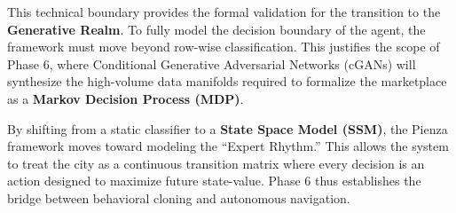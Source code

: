 This technical boundary provides the formal validation for the transition to the \textbf{Generative Realm}. To fully model the decision boundary of the agent, the framework must move beyond row-wise classification. This justifies the scope of Phase 6, where Conditional Generative Adversarial Networks (cGANs) will synthesize the high-volume data manifolds required to formalize the marketplace as a \textbf{Markov Decision Process (MDP)}. 

By shifting from a static classifier to a \textbf{State Space Model (SSM)}, the Pienza framework moves toward modeling the ``Expert Rhythm.'' This allows the system to treat the city as a continuous transition matrix where every decision is an action designed to maximize future state-value. Phase 6 thus establishes the bridge between behavioral cloning and autonomous navigation.




